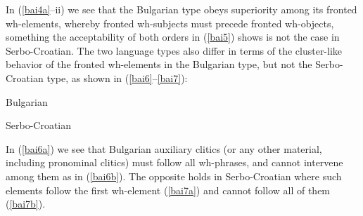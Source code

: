 \documentclass[output=paper]{langscibook}
\begin{document}
In (\ref{bai4a}--ii) we see that the Bulgarian type obeys superiority among its fronted wh-elements, whereby fronted wh-subjects must precede fronted wh-objects, something the acceptability of both orders in (\ref{bai5}) shows is not the case in Serbo-Croatian. The two language types also differ in terms of the cluster-like behavior of the fronted wh-elements in the Bulgarian type, but not the Serbo-Croatian type, as shown in (\ref{bai6}--\ref{bai7}):

\begin{exe}
\ex Bulgarian\label{bai6}
\begin{xlist}

\end{xlist}
\end{exe}

\begin{exe}
\ex Serbo-Croatian\label{bai7}
\begin{xlist}

\end{xlist}
\end{exe}

In (\ref{bai6a}) we see that Bulgarian auxiliary clitics (or any other material, including pronominal clitics) must follow all wh-phrases, and cannot intervene among them as in (\ref{bai6b}). The opposite holds in Serbo-Croatian where such elements follow the first wh-element (\ref{bai7a}) and cannot follow all of them (\ref{bai7b}). 

\begin{exe}
\ex \label{bai8}
\begin{xlist}
\end{xlist}
\end{exe}
\end{document}
